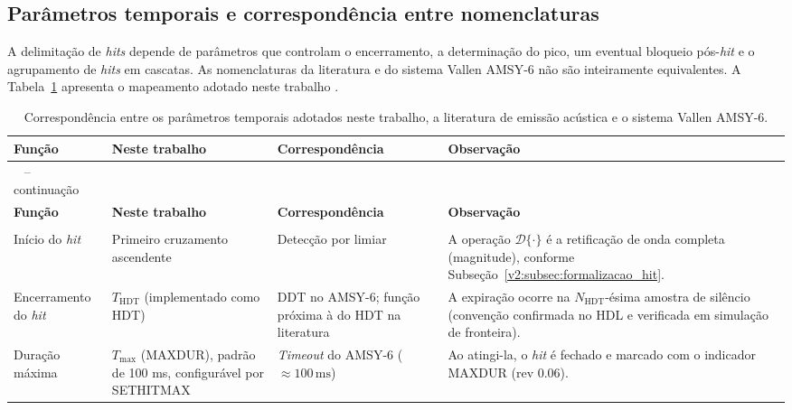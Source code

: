 \subsection{Parâmetros temporais e correspondência entre nomenclaturas}
\label{v2:subsec:parametros_temporizacao}

A delimitação de \textit{hits} depende de parâmetros que controlam o encerramento, a determinação do pico, um eventual bloqueio pós-\textit{hit} e o agrupamento de \textit{hits} em cascatas. As nomenclaturas da literatura e do sistema Vallen AMSY-6 não são inteiramente equivalentes. A Tabela~\ref{v2:tab:parametros_temporizacao} apresenta o mapeamento adotado neste trabalho \cite{unnthorsson2013,vallen2022}.

\begingroup
\footnotesize
\renewcommand{\arraystretch}{1.25}
\begin{longtable}
	{|>{\raggedright\arraybackslash}p{}
		|>{\raggedright\arraybackslash}p{}
		|>{\raggedright\arraybackslash}p{}
		|>{\raggedright\arraybackslash}p{}|}
	\caption{Correspondência entre os parâmetros temporais adotados neste trabalho, a literatura de emissão acústica e o sistema Vallen AMSY-6.}
	\label{v2:tab:parametros_temporizacao}\\
	\hline
	\textbf{Função} & \textbf{Neste trabalho} & \textbf{Correspondência} & \textbf{Observação} \\
	\hline
	\endfirsthead
	\multicolumn{4}{c}
	{\tablename\ \thetable{} -- continuação}\\
	\hline
	\textbf{Função} & \textbf{Neste trabalho} & \textbf{Correspondência} & \textbf{Observação} \\
	\hline
	\endhead
	\hline
	\multicolumn{4}{r}{Continua na próxima página.}\\
	\endfoot
	\hline
	\endlastfoot
	Início do \textit{hit} & Primeiro cruzamento ascendente & Detecção por limiar & A operação \(\mathcal{D}\{\cdot\}\) é a retificação de onda completa (magnitude), conforme Subseção~\ref{v2:subsec:formalizacao_hit}. \\
	\hline
	Encerramento do \textit{hit} & \(T_{\mathrm{HDT}}\) (implementado como HDT) & DDT no AMSY-6; função próxima à do HDT na literatura & A expiração ocorre na \(N_{\mathrm{HDT}}\)-ésima amostra de silêncio (convenção confirmada no HDL e verificada em simulação de fronteira). \\
	\hline
	Duração máxima & \(T_{\max}\) (MAXDUR), padrão de 100 ms, configurável por SETHITMAX & \textit{Timeout} do AMSY-6 (\(\approx 100\,\mathrm{ms}\)) & Ao atingi-la, o \textit{hit} é fechado e marcado com o indicador MAXDUR (rev 0.06). \\

\end{longtable}
